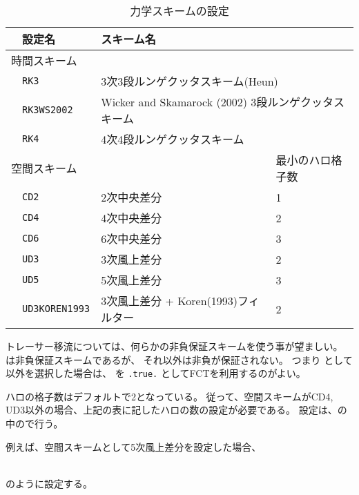\begin{table}[h]
\begin{center}
  \caption{力学スキームの設定}
  \label{tab:nml_atm_dyn}
  \begin{tabularx}{150mm}{llXX} \hline
    \rowcolor[gray]{0.9} & \multicolumn{1}{l}{設定名} & \multicolumn{1}{l}{スキーム名} & \\ \hline
    \multicolumn{3}{l}{時間スキーム} &  \\ \hline
    & \multicolumn{1}{l}{\verb|RK3|} & \multicolumn{2}{l}{3次3段ルンゲクッタスキーム(Heun)} \\
    & \multicolumn{1}{l}{\verb|RK3WS2002|} & \multicolumn{2}{l}{Wicker and Skamarock (2002) 3段ルンゲクッタスキーム} \\
    & \multicolumn{1}{l}{\verb|RK4|} & \multicolumn{2}{l}{4次4段ルンゲクッタスキーム} \\
    \hline
    \multicolumn{3}{l}{空間スキーム} & 最小のハロ格子数\\ \hline
    & \multicolumn{1}{l}{\verb|CD2|} & \multicolumn{1}{l}{2次中央差分} & \multicolumn{1}{l}{1}\\
    & \multicolumn{1}{l}{\verb|CD4|} & \multicolumn{1}{l}{4次中央差分} & \multicolumn{1}{l}{2}\\
    & \multicolumn{1}{l}{\verb|CD6|} & \multicolumn{1}{l}{6次中央差分} & \multicolumn{1}{l}{3}\\
    & \multicolumn{1}{l}{\verb|UD3|} & \multicolumn{1}{l}{3次風上差分} & \multicolumn{1}{l}{2}\\
    & \multicolumn{1}{l}{\verb|UD5|} & \multicolumn{1}{l}{5次風上差分} & \multicolumn{1}{l}{3}\\
    & \multicolumn{1}{l}{\verb|UD3KOREN1993|} & \multicolumn{1}{X}{3次風上差分 + Koren(1993)フィルター} & \multicolumn{1}{l}{2}\\
\hline
  \end{tabularx}
\end{center}
\end{table}

トレーサー移流については、何らかの非負保証スキームを使う事が望ましい。
は非負保証スキームであるが、
それ以外は非負が保証されない。
つまり として 以外を選択した場合は、
 を \verb|.true.| としてFCTを利用するのがよい。

ハロの格子数はデフォルトで2となっている。
従って、空間スキームがCD4, UD3以外の場合、上記の表に記したハロの数の設定が必要である。
設定は、の中ので行う。

例えば、空間スキームとして5次風上差分を設定した場合、

\\

のように設定する。

